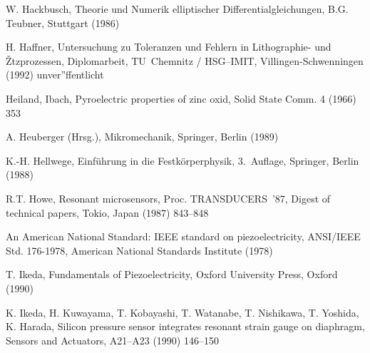 \begin{thebibliography}{xxx}

 W. Hackbusch, Theorie und Numerik elliptischer Differentialgleichungen,
 B.G. Teubner, Stuttgart (1986)

 H. Haffner, Untersuchung zu Toleranzen und Fehlern in Lithographie- und
 Žtzprozessen, Diplomarbeit, TU~Chemnitz / HSG--IMIT, Villingen-Schwenningen
 (1992) unver”ffentlicht

 Heiland, Ibach, Pyroelectric properties of zinc oxid, Solid State Comm.
 4 (1966) 353



 A. Heuberger (Hrsg.), Mikromechanik, Springer, Berlin (1989)

 K.-H. Hellwege, Einführung in die Festkörperphysik, 3.~Auflage,
 Springer, Berlin (1988)


 R.T. Howe, Resonant microsensors, Proc. TRANSDUCERS~'87, Digest of
 technical papers, Tokio, Japan (1987) 843--848

 An American National Standard: IEEE standard on piezoelectricity,
 ANSI/IEEE Std. 176-1978, American National Standards Institute (1978)


 T. Ikeda, Fundamentals of Piezoelectricity, Oxford University Press,
 Oxford (1990)

 K. Ikeda, H. Kuwayama, T. Kobayashi, T. Watanabe, T. Nishikawa, T. Yoshida,
 K. Harada, Silicon pressure sensor integrates resonant strain gauge on
 diaphragm, Sensors and Actuators, A21--A23 (1990) 146--150


\end{thebibliography}

